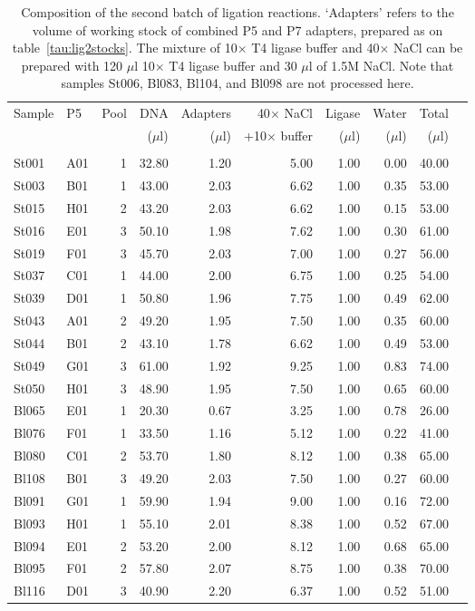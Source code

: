 \documentclass[a4paper,12pt,twosided]{article}
\begin{document}
\begin{table}
\begin{center}
{\footnotesize
\caption{Composition of the second batch of ligation reactions. `Adapters' refers to the volume of working stock of combined P5 and P7 adapters, prepared as on table~\ref{tau:lig2stocks}. The mixture of 10$\times$ T4 ligase buffer and 40$\times$ NaCl can be prepared with 120 $\mu$l 10$\times$ T4 ligase buffer and 30 $\mu$l of 1.5M NaCl. Note that samples St006, Bl083, Bl104, and Bl098 are not processed here.}\label{tau:ligations4}
\vspace*{0.2cm}
\begin{tabular}{llrrrrrrrr}
\toprule
Sample&P5&Pool&DNA&Adapters&40$\times$ NaCl&Ligase&Water&Total\\
&&&($\mu$l)&($\mu$l)&+10$\times$ buffer&($\mu$l)&($\mu$l)&($\mu$l)\\
\midrule\\
St001&A01&1&32.80&1.20&5.00&1.00&0.00&40.00\\
St003&B01&1&43.00&2.03&6.62&1.00&0.35&53.00\\
St015&H01&2&43.20&2.03&6.62&1.00&0.15&53.00\\
St016&E01&3&50.10&1.98&7.62&1.00&0.30&61.00\\
St019&F01&3&45.70&2.03&7.00&1.00&0.27&56.00\\
St037&C01&1&44.00&2.00&6.75&1.00&0.25&54.00\\
St039&D01&1&50.80&1.96&7.75&1.00&0.49&62.00\\
St043&A01&2&49.20&1.95&7.50&1.00&0.35&60.00\\
St044&B01&2&43.10&1.78&6.62&1.00&0.49&53.00\\
St049&G01&3&61.00&1.92&9.25&1.00&0.83&74.00\\
St050&H01&3&48.90&1.95&7.50&1.00&0.65&60.00\\
Bl065&E01&1&20.30&0.67&3.25&1.00&0.78&26.00\\
Bl076&F01&1&33.50&1.16&5.12&1.00&0.22&41.00\\
Bl080&C01&2&53.70&1.80&8.12&1.00&0.38&65.00\\
Bl108&B01&3&49.20&2.03&7.50&1.00&0.27&60.00\\
Bl091&G01&1&59.90&1.94&9.00&1.00&0.16&72.00\\
Bl093&H01&1&55.10&2.01&8.38&1.00&0.52&67.00\\
Bl094&E01&2&53.20&2.00&8.12&1.00&0.68&65.00\\
Bl095&F01&2&57.80&2.07&8.75&1.00&0.38&70.00\\
Bl116&D01&3&40.90&2.20&6.37&1.00&0.52&51.00\\
\bottomrule
\end{tabular}}
\end{center}
\end{table}
\end{document}
